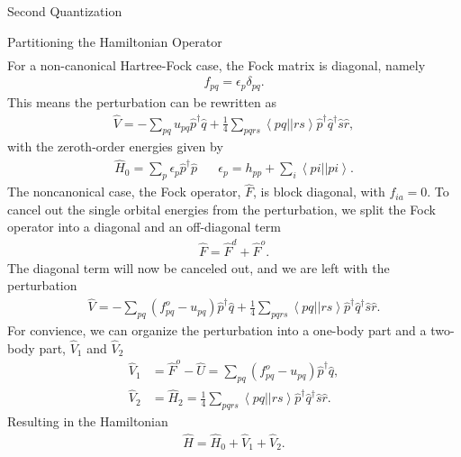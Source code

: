 \documentclass[twoside,english]{uiofysmaster}
\begin{document}
\begin{chapter}{Second Quantization}
\begin{section}{Partitioning the Hamiltonian Operator}
\begin{align}
		\end{align}
		For a non-canonical Hartree-Fock case, the Fock matrix is diagonal, namely
		\begin{align}
			f_{pq} = \epsilon_p \delta_{pq}.
		\end{align}
		This means the perturbation can be rewritten as
		\begin{align}
			\hat V = -\sum_{pq} u_{pq} \hat p^\dagger \hat q + \frac{1}{4} \sum_{pqrs} \left<pq||rs\right> \hat p^\dagger \hat q^\dagger \hat s \hat r,	
			\label{3.95}
		\end{align}
		with the zeroth-order energies given by 
		\begin{align}
			\hat H_0 = \sum_p \epsilon_p \hat p^\dagger \hat p \;\;\;\;\;\; \epsilon_p = h_{pp} + \sum_i \left<pi||pi\right>.
		\end{align}
		The noncanonical case, the Fock operator, $\hat F$, is
                block diagonal, with $f_{ia} = 0$. To cancel out the
                single orbital energies from the perturbation, we
                split the Fock operator into a diagonal and
                an off-diagonal term
		\begin{align}
			\hat F = \hat F^d + \hat F^o.
		\end{align}
		The diagonal term will now be canceled out, and we are left with the perturbation
		\begin{align}
			\hat V = -\sum_{pq} (f_{pq}^o - u_{pq}) \hat p^\dagger \hat q + \frac{1}{4} \sum_{pqrs} \left<pq||rs\right> \hat p^\dagger \hat q^\dagger \hat s \hat r.
		\end{align}
		For convience, we can organize the perturbation into a one-body part and a two-body part, $\hat V_1$ and $\hat V_2$
		\begin{align}
			\hat V_1 &= \hat F^o - \hat U = \sum_{pq} (f_{pq}^o - u_{pq}) \hat p^\dagger \hat q, \\
			\hat V_2 &= \hat H_2 = \frac{1}{4} \sum_{pqrs} \left< pq||rs\right> \hat p^\dagger \hat q^\dagger \hat s \hat r.
			\label{Partitioned Hamiltonian}
		\end{align}
		Resulting in the Hamiltonian
		\begin{align}
			\hat H = \hat H_0 + \hat V_1 + \hat V_2.
		\end{align}

	\end{section}


\end{chapter}
\end{document}
